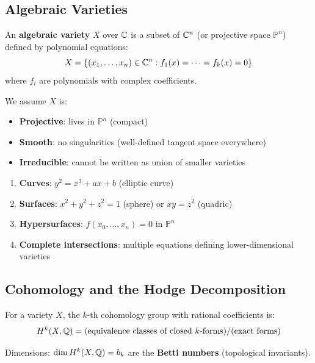 \subsection{Algebraic Varieties}

\begin{defn}\label{def:algebraic-variety}
An \textbf{algebraic variety} $X$ over $\mathbb{C}$ is a subset of $\mathbb{C}^n$ (or projective space $\mathbb{P}^n$) defined by polynomial equations:
\begin{equation}
X = \{(x_1, \ldots, x_n) \in \mathbb{C}^n : f_1(x) = \cdots = f_k(x) = 0\}
\end{equation}
where $f_i$ are polynomials with complex coefficients.

We assume $X$ is:
\begin{itemize}
\item \textbf{Projective}: lives in $\mathbb{P}^n$ (compact)
\item \textbf{Smooth}: no singularities (well-defined tangent space everywhere)
\item \textbf{Irreducible}: cannot be written as union of smaller varieties
\end{itemize}
\end{defn}

\begin{example}
\begin{enumerate}
\item \textbf{Curves}: $y^2 = x^3 + ax + b$ (elliptic curve)
\item \textbf{Surfaces}: $x^2 + y^2 + z^2 = 1$ (sphere) or $xy = z^2$ (quadric)
\item \textbf{Hypersurfaces}: $f(x_0, \ldots, x_n) = 0$ in $\mathbb{P}^n$
\item \textbf{Complete intersections}: multiple equations defining lower-dimensional varieties
\end{enumerate}
\end{example}

\subsection{Cohomology and the Hodge Decomposition}

\begin{defn}\label{def:singular-cohomology}
For a variety $X$, the $k$-th cohomology group with rational coefficients is:
\begin{equation}
H^k(X, \mathbb{Q}) = \text{(equivalence classes of closed } k\text{-forms)} / \text{(exact forms)}
\end{equation}

Dimensions: $\dim H^k(X, \mathbb{Q}) = b_k$ are the \textbf{Betti numbers} (topological invariants).
\end{defn}

